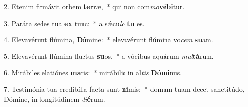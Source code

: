 2. Etenim firmávit orbem \textbf{ter}ræ,~*  qui non com\textit{mo}\textbf{vé}\textbf{bi}tur.\

3. Paráta sedes tua \textbf{ex} tunc:~*  a sǽcu\textit{lo} \textbf{tu} es.\

4. Elevavérunt flúmina, \textbf{Dó}mine:~*  elevavérunt flúmina vo\textit{cem} \textbf{su}am.\

5. Elevavérunt flúmina fluctus \textbf{su}os,~*  a vócibus aquárum \textit{mul}\textbf{tá}rum.\

6. Mirábiles elatiónes \textbf{ma}ris:~*  mirábilis in al\textit{tis} \textbf{Dó}\textbf{mi}nus.\

7. Testimónia tua credibília facta sunt \textbf{ni}mis:~*  domum tuam decet sanctitúdo, Dómine, in longitúdinem \textit{di}\textbf{é}rum.\

